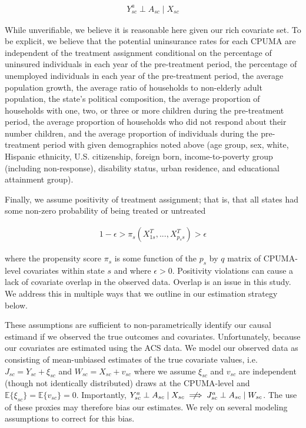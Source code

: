 \documentclass[aoas]{imsart}
\theoremstyle{plain}
\theoremstyle{remark}
\begin{document}
\begin{align*}
Y_{sc}^a \perp A_{sc} \mid X_{sc}
\end{align*}

While unverifiable, we believe it is reasonable here given our rich covariate set. To be explicit, we believe that the potential uninsurance rates for each CPUMA are independent of the treatment assignment conditional on the percentage of uninsured individuals in each year of the pre-treatment period, the percentage of unemployed individuals in each year of the pre-treatment period, the average population growth, the average ratio of households to non-elderly adult population, the state's political composition, the average proportion of households with one, two, or three or more children during the pre-treatment period, the average proportion of households who did not respond about their number children, and the average proportion of individuals during the pre-treatment period with given demographics noted above (age group, sex, white, Hispanic ethnicity, U.S. citizenship, foreign born, income-to-poverty group (including non-response), disability status, urban residence, and educational attainment group). 

Finally, we assume positivity of treatment assignment; that is, that all states had some non-zero probability of being treated or untreated

\begin{align*}
1 - \epsilon > \pi_s(X_{1s}^T, ..., X_{p_ss}^T) > \epsilon
\end{align*}

where the propensity score $\pi_s$ is some function of the $p_s$ by $q$ matrix of CPUMA-level covariates within state $s$ and where $\epsilon > 0$. Positivity violations can cause a lack of covariate overlap in the observed data. Overlap is an issue in this study. We address this in multiple ways that we outline in our estimation strategy below. 

These assumptions are sufficient to non-parametrically identify our causal estimand if we observed the true outcomes and covariates. Unfortunately, because our covariates are estimated using the ACS data. We model our observed data as consisting of mean-unbiased estimates of the true covariate values, i.e. $J_{sc} = Y_{sc} + \xi_{sc}$ and $W_{sc} = X_{sc} + v_{sc}$ where we assume $\xi_{sc}$ and $v_{sc}$ are independent (though not identically distributed) draws at the CPUMA-level and $\mathbb{E}\{\xi_{sc}\} = \mathbb{E}\{v_{sc}\} = 0$. Importantly, $Y_{sc}^a \perp A_{sc} \mid X_{sc} \centernot\implies J_{sc}^a \perp A_{sc} \mid W_{sc}$. The use of these proxies may therefore bias our estimates. We rely on several modeling assumptions to correct for this bias.
\end{document}
